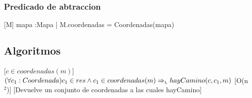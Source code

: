 \begin{Representacion}
\subsubsection{Predicado de abtraccion}

[M]{ mapa :Mapa | M.coordenadas = Coordenadas(mapa)}

\end{Representacion}

\subsection{Algoritmos}



[$c \in coordenadas(m)$]
{$(\forall c_1: Coordenada) c_1 \in res \wedge c_1 \in coordenadas(m) \Rightarrow_{\mathrm{\scriptscriptstyle{L}}} hayCamino(c, c_1, m)$}
[O(n$^2$)]
[Devuelve un conjunto de coordenadas a las cuales hayCamino]
\\


